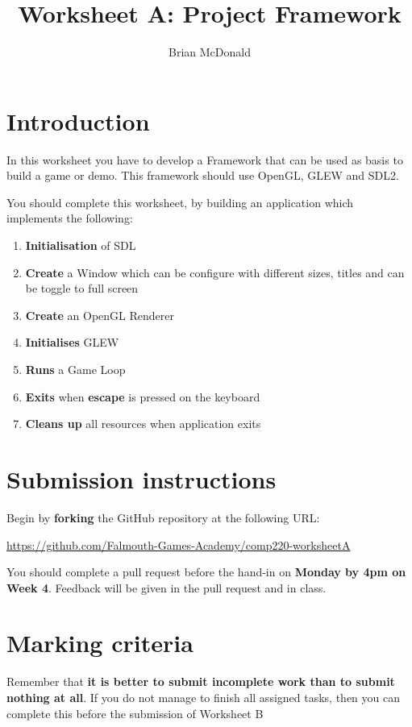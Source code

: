 \documentclass{../../../fal_assignment}
\title{Worksheet A: Project Framework}
\author{Brian McDonald}
\begin{document}
\maketitle

\section*{Introduction}

In this worksheet you have to develop a Framework that can be used as basis to build a game or demo. This framework should use OpenGL, GLEW and SDL2.

You should complete this worksheet, by building an application which implements the following:
\begin{enumerate}[label=(\alph*)]
	\item \textbf{Initialisation} of SDL
	\item \textbf{Create} a Window which can be configure with different sizes, titles and can be toggle to full screen
	\item \textbf{Create} an OpenGL Renderer
	\item \textbf{Initialises} GLEW
	\item \textbf{Runs} a Game Loop
	\item \textbf{Exits} when \textbf{escape} is pressed on the keyboard 
	\item \textbf{Cleans up} all resources when application exits
\end{enumerate}

\section*{Submission instructions}

Begin by \textbf{forking} the GitHub repository at the following URL:

\url{https://github.com/Falmouth-Games-Academy/comp220-worksheetA}

You should complete a pull request before the hand-in on \textbf{Monday by 4pm on Week 4}. Feedback will be given in the pull request and in class.

\section*{Marking criteria}

Remember that \textbf{it is better to submit incomplete work than to submit nothing at all}. If you do not manage to finish all assigned tasks, then you can complete this before the submission of Worksheet B
\end{document}
